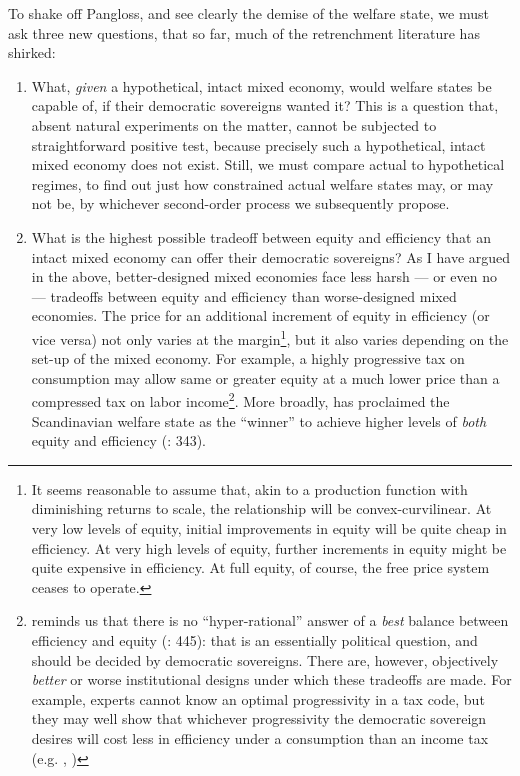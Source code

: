 \documentclass[11pt,a4paper,oneside,openright]{article}
\begin{document}

To shake off Pangloss, and see clearly the demise of the welfare state, we must ask three new questions, that so far, much of the retrenchment literature has shirked:
\begin{enumerate}
	\item What, \emph{given} a hypothetical, intact mixed economy, would welfare states be capable of, if their democratic sovereigns wanted it? This is a question that, absent natural experiments on the matter, cannot be subjected to straightforward positive test, because precisely such a hypothetical, intact mixed economy does not exist. Still, we must compare actual to hypothetical regimes, to find out just how constrained actual welfare states may, or may not be, by whichever second-order process we subsequently propose.
	
	\item What is the highest possible tradeoff between equity and efficiency that an intact mixed economy can offer their democratic sovereigns? As I have argued in the above, better-designed mixed economies face less harsh --- or even no --- tradeoffs between equity and efficiency than worse-designed mixed economies. The price for an additional increment of equity in efficiency (or vice versa) not only varies at the margin\footnote{
		It seems reasonable to assume that, akin to a production function with diminishing returns to scale, the relationship will be convex-curvilinear. At very low levels of equity, initial improvements in equity will be quite cheap in efficiency. At very high levels of equity, further increments in equity might be quite expensive in efficiency. At full equity, of course, the free price system ceases to operate.}, 
	but it also varies depending on the set-up of the mixed economy. For example, a highly progressive tax on consumption may allow same or greater equity at a much lower price than a compressed tax on labor income\footnote{
		\citeauthor{Offe2003} reminds us that there is no ``hyper-rational'' answer of a \emph{best} balance between efficiency and equity (\citeyear{Offe2003}: 445): that is an essentially political question, and should be decided by democratic sovereigns. There are, however, objectively \emph{better} or {worse} institutional designs under which these tradeoffs are made. For example, experts cannot know an optimal progressivity in a tax code, but they may well show that whichever progressivity the democratic sovereign desires will cost less in efficiency under a consumption than an income tax (e.g. \citealt{McCaffery2005}, \citealt{Frank2005})}.
	More broadly, \citeauthor{Ganßmann2010} has proclaimed the Scandinavian welfare state as the ``winner'' to achieve higher levels of \emph{both} equity and efficiency (\citeyear{Ganßmann2010}: 343). 
	

\end{enumerate}
\end{document}

